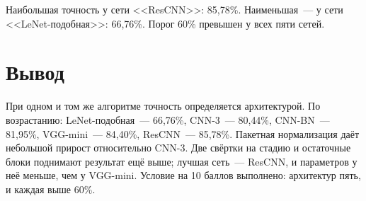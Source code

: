 \documentclass[12pt,a4paper]{article}
\begin{document}
Наибольшая точность у сети <<ResCNN>>: 85{,}78\%. Наименьшая~--- у сети <<LeNet-подобная>>: 66{,}76\%. Порог 60\% превышен у всех пяти сетей.

\section{Вывод}

При одном и том же алгоритме точность определяется архитектурой. По возрастанию: LeNet-подобная~--- 66{,}76\%, CNN-3~--- 80{,}44\%, CNN-BN~--- 81{,}95\%, VGG-mini~--- 84{,}40\%, ResCNN~--- 85{,}78\%. Пакетная нормализация даёт небольшой прирост относительно CNN-3. Две свёртки на стадию и остаточные блоки поднимают результат ещё выше; лучшая сеть~--- ResCNN, и параметров у неё меньше, чем у VGG-mini. Условие на 10 баллов выполнено: архитектур пять, и каждая выше 60\%.
\end{document}
